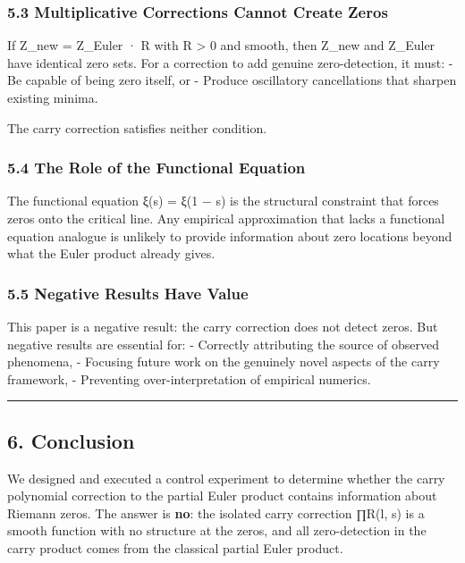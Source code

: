 \documentclass[
  11pt,
]{article}
\begin{document}
\subsubsection{5.3 Multiplicative Corrections Cannot Create
Zeros}\label{multiplicative-corrections-cannot-create-zeros}

If Z\_new = Z\_Euler · R with R \textgreater{} 0 and smooth, then Z\_new and
Z\_Euler have identical zero sets. For a correction to add genuine
zero-detection, it must: - Be capable of being zero itself, or - Produce
oscillatory cancellations that sharpen existing minima.

The carry correction satisfies neither condition.

\subsubsection{5.4 The Role of the Functional
Equation}\label{the-role-of-the-functional-equation}

The functional equation ξ(s) = ξ(1 − s) is the structural constraint that forces
zeros onto the critical line. Any empirical approximation that lacks a
functional equation analogue is unlikely to provide information about zero
locations beyond what the Euler product already gives.

\subsubsection{5.5 Negative Results Have
Value}\label{negative-results-have-value}

This paper is a negative result: the carry correction does not detect zeros. But
negative results are essential for: - Correctly attributing the source of
observed phenomena, - Focusing future work on the genuinely novel aspects of the
carry framework, - Preventing over-interpretation of empirical numerics.

\begin{center}\rule{0.5\linewidth}{0.5pt}\end{center}

\newpage

\subsection{6. Conclusion}\label{conclusion}

We designed and executed a control experiment to determine whether the carry
polynomial correction to the partial Euler product contains information about
Riemann zeros. The answer is \textbf{no}: the isolated carry correction ∏R(l, s)
is a smooth function with no structure at the zeros, and all zero-detection in
the carry product comes from the classical partial Euler product.
\end{document}
